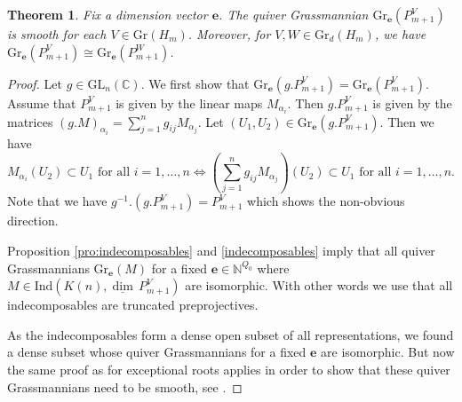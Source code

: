 \documentclass{amsart}
\newtheorem{theorem}{Theorem}[section]
\numberwithin{equation}{section}
\newcommand{\bfe}{\mathbf{e}}
\newcommand\udim{{\underline{\dim}\, }}
\newcommand{\Gr}{\mathrm{Gr}}
\newcommand{\GL}{\mathrm{GL}}
\newcommand{\Ind}{\mathrm{Ind}}
\newcommand{\CC}{\mathbb{C}}
\newcommand{\NN}{\mathbb{N}}
\begin{document}
\begin{theorem}\label{thm:truncpp}
  Fix a dimension vector $\bfe$.
  The quiver Grassmannian $\Gr_\bfe(P_{m+1}^V)$ is smooth for each $V\in \Gr(H_m)$.
  Moreover, for $V,W\in \Gr_d(H_m)$, we have $\Gr_\bfe(P_{m+1}^V)\cong \Gr_\bfe(P_{m+1}^W)$.
\end{theorem}
\begin{proof}
  Let $g\in\GL_n(\CC)$.
  We first show that $\Gr_\bfe(g.P_{m+1}^V)=\Gr_\bfe(P_{m+1}^V)$.
  Assume that $P_{m+1}^V$ is given by the linear maps $M_{\alpha_i}$.
  Then $g.P_{m+1}^V$ is given by the matrices $(g.M)_{\alpha_i}=\sum\limits_{j=1}^n g_{ij}M_{\alpha_j}$.
  Let $(U_1,U_2)\in\Gr_\bfe(g.P_{m+1}^V)$.
  Then we have  
  \[M_{\alpha_i}(U_2)\subset U_1 \text{ for all } i=1,\ldots,n\Leftrightarrow \left(\sum\limits_{j=1}^n g_{ij}M_{\alpha_j}\right)(U_2)\subset U_1 \text{ for all } i=1,\ldots,n.\]
  Note that we have $g^{-1}.(g.P_{m+1}^V)=P_{m+1}^V$ which shows the non-obvious direction.

  Proposition \ref{pro:indecomposables} and \ref{indecomposables} imply that all quiver Grassmannians $\Gr_\bfe(M)$ for a fixed $\bfe\in\NN^{Q_0}$ where $M\in\Ind(K(n),\udim P_{m+1}^V)$ are isomorphic.
  With other words we use that all indecomposables are truncated preprojectives.

  As the indecomposables form a dense open subset of all representations, we found a dense subset whose quiver Grassmannians for a fixed $\bfe$ are isomorphic.
  But now the same proof as for exceptional roots applies in order to show that these quiver Grassmannians need to be smooth, see \cite[Corollary 4]{cr}.
\end{proof}
\end{document}
